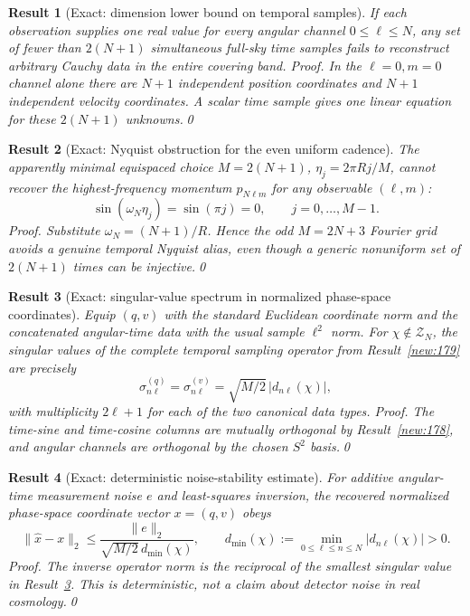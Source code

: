 \documentclass[aps,prd,onecolumn,notitlepage,groupedaddress,11pt]{revtex4-2}
\newtheorem{result}{Result}
\begin{document}
\begin{result}[\textsf{Exact}: dimension lower bound on temporal samples]\label{new:180}
If each observation supplies one real value for every angular channel $0\le\ell\le N$, any set of fewer than $2(N+1)$ simultaneous full-sky time samples fails to reconstruct arbitrary Cauchy data in the entire covering band.
\textit{Proof.} In the $\ell=0,m=0$ channel alone there are $N+1$ independent position coordinates and $N+1$ independent velocity coordinates. A scalar time sample gives one linear equation for these $2(N+1)$ unknowns.\qed
\end{result}

\begin{result}[\textsf{Exact}: Nyquist obstruction for the even uniform cadence]\label{new:181}
The apparently minimal equispaced choice $M=2(N+1)$, $\eta_j=2\pi Rj/M$, cannot recover the highest-frequency momentum $p_{N\ell m}$ for any observable $(\ell,m)$:
\begin{equation}\label{new:eq181}
 \sin(\omega_N\eta_j)=\sin(\pi j)=0,\qquad j=0,\ldots,M-1.
\end{equation}
\textit{Proof.} Substitute $\omega_N=(N+1)/R$. Hence the odd $M=2N+3$ Fourier grid avoids a genuine temporal Nyquist alias, even though a generic \emph{nonuniform} set of $2(N+1)$ times can be injective.\qed
\end{result}

\begin{result}[\textsf{Exact}: singular-value spectrum in normalized phase-space coordinates]\label{new:182}
Equip $(q,v)$ with the standard Euclidean coordinate norm and the concatenated angular-time data with the usual sample $\ell^2$ norm. For $\chi\notin\mathcal Z_N$, the singular values of the complete temporal sampling operator from Result~\ref{new:179} are precisely
\begin{equation}\label{new:eq182}
 \sigma_{n\ell}^{(q)}=\sigma_{n\ell}^{(v)}=\sqrt{M/2}\,|d_{n\ell}(\chi)|,
\end{equation}
with multiplicity $2\ell+1$ for each of the two canonical data types. \textit{Proof.} The time-sine and time-cosine columns are mutually orthogonal by Result~\ref{new:178}, and angular channels are orthogonal by the chosen $S^2$ basis.\qed
\end{result}

\begin{result}[\textsf{Exact}: deterministic noise-stability estimate]\label{new:183}
For additive angular-time measurement noise $e$ and least-squares inversion, the recovered normalized phase-space coordinate vector $x=(q,v)$ obeys
\begin{equation}\label{new:eq183}
 \|\widehat x-x\|_2\le\frac{\|e\|_2}{\sqrt{M/2}\,d_{\min}(\chi)},\qquad d_{\min}(\chi):=\min_{0\le\ell\le n\le N}|d_{n\ell}(\chi)|>0.
\end{equation}
\textit{Proof.} The inverse operator norm is the reciprocal of the smallest singular value in Result~\ref{new:182}. This is deterministic, not a claim about detector noise in real cosmology.\qed
\end{result}
\end{document}
